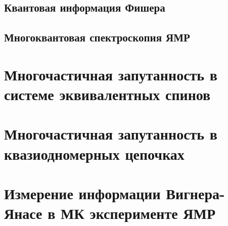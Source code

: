 \documentclass[
    aspectratio=169
]{beamer}
\begin{document}
\subsection{Квантовая информация Фишера}


\subsection{Многоквантовая спектроскопия ЯМР}




%

\section{Многочастичная запутанность в системе эквивалентных спинов}




\section{Многочастичная запутанность в квазиодномерных цепочках}




\section{Измерение информации Вигнера-Янасе в МК эксперименте ЯМР}

\end{document}
